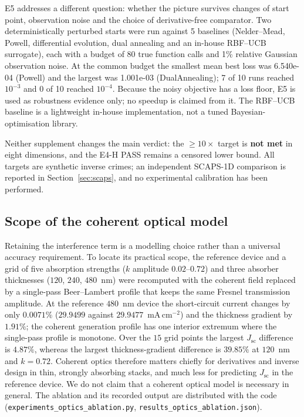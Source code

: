 \documentclass[preprint,12pt]{elsarticle}
\begin{document}
E5 addresses a different question: whether the picture survives changes of
start point, observation noise and the choice of derivative-free comparator.
Two deterministically perturbed starts were run against 5
baselines (Nelder--Mead, Powell, differential evolution, dual annealing and an
in-house RBF--UCB surrogate), each with a budget of 80 true
function calls and 1\% relative Gaussian observation noise. At the
common budget the smallest mean best loss was 6.540e-04 (Powell) and the largest was 1.001e-03 (DualAnnealing);
7 of 10 runs reached $10^{-3}$ and 0 of 10
reached $10^{-4}$. Because the noisy objective has a loss floor, E5 is used as
robustness evidence only; no speedup is claimed from it. The RBF--UCB baseline
is a lightweight in-house implementation, not a tuned Bayesian-optimisation
library.

Neither supplement changes the main verdict: the $\ge10\times$ target is
\textbf{not met} in eight dimensions, and the E4-H PASS remains a censored
lower bound. All targets are synthetic inverse crimes; an independent
SCAPS-1D comparison is reported in Section~\ref{sec:scaps}, and no
experimental calibration has been performed.

\subsection{Scope of the coherent optical model}
\label{sec:ablation}

Retaining the interference term is a modelling choice rather than a universal
accuracy requirement. To locate its practical scope, the reference device and
a grid of five absorption strengths ($k$ amplitude $0.02$--$0.72$) and three
absorber thicknesses ($120$, $240$, $480$~nm) were recomputed with the
coherent field replaced by a single-pass Beer--Lambert profile that keeps the
same Fresnel transmission amplitude. At the reference $480$~nm device the
short-circuit current changes by only $0.0071\%$ ($29.9499$ against
$29.9477$~mA\,cm$^{-2}$) and the thickness gradient by $1.91\%$; the coherent
generation profile has one interior extremum where the single-pass profile is
monotone. Over the $15$ grid points the largest $J_{\mathrm{sc}}$ difference
is $4.87\%$, whereas the largest thickness-gradient difference is $39.85\%$
at $120$~nm and $k=0.72$. Coherent optics therefore matters chiefly for
derivatives and inverse design in thin, strongly absorbing stacks, and much
less for predicting $J_{\mathrm{sc}}$ in the reference device. We do not
claim that a coherent optical model is necessary in general. The ablation and
its recorded output are distributed with the code
(\texttt{experiments\_optics\_ablation.py},
\texttt{results\_optics\_ablation.json}).
\end{document}
